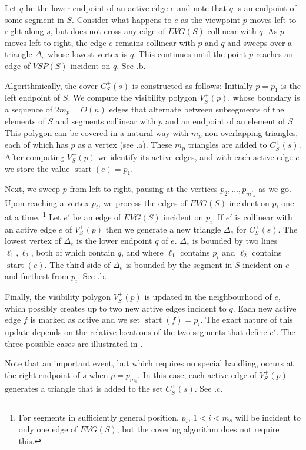 \documentclass{patmorin}
\newcommand{\EVG}{\mathit{EVG}}
\newcommand{\VSP}{\mathit{VSP}}
\DeclareMathOperator{\start}{start}
\begin{document}
Let $q$ be the lower endpoint of an active edge $e$ and note that $q$
is an endpoint of some segment in $S$. Consider what happens to $e$
as the viewpoint $p$ moves left to right along $s$, but does not cross
any edge of $\EVG(S)$ collinear with $q$.  As $p$ moves left to right,
the edge $e$ remains collinear with $p$ and $q$ and sweeps over a
triangle $\Delta_e$ whose lowest vertex is $q$.  This continues until
 the point $p$ reaches an edge of $\VSP(S)$ incident on $q$.
See .b.

Algorithmically, the cover $C^+_S(s)$ is constructed as follows: Initially
$p=p_1$ is the left endpoint of $S$.  We compute the visibility polygon
$V^+_S(p)$, whose boundary is a sequence of $2m_p=O(n)$ edges that alternate
between subsegments of the elements of $S$ and segments collinear with $p$
and an endpoint of an element of $S$.  This polygon can be covered in a
natural way with $m_p$ non-overlapping triangles, each of which has $p$
as a vertex (see .a). These $m_p$ triangles are added to
$C^+_S(s)$.  After computing $V^+_S(p)$ we identify its active edges, and with
each active edge $e$ we store the value $\start(e)=p_1$.


Next, we sweep $p$ from left to right, pausing at the vertices
$p_2,\ldots,p_{m'_s}$ as we go.  Upon reaching a vertex $p_i$, we process
the edges of $\EVG(S)$ incident on $p_i$ one at a time.  \footnote{For
segments in sufficiently general position, $p_i$, $1<i<m_s$ will be
incident to only one edge of $\EVG(S)$, but the covering algorithm does
not require this.} Let $e'$ be an edge of $\EVG(S)$ incident on $p_i$. If
$e'$ is collinear with an active edge $e$ of $V^+_S(p)$ then we generate a
new triangle $\Delta_e$ for $C^+_S(s)$.  The lowest vertex of $\Delta_e$
is the lower endpoint $q$ of $e$. $\Delta_e$ is bounded by two lines
$\ell_1, \ell_2$, both of which contain $q$, and where $\ell_1$ contains
$p_i$ and $\ell_2$ contains $\start(e)$.  The third side of $\Delta_e$
is bounded by the segment in $S$ incident on $e$ and furthest from $p_i$.
See .b.

Finally, the visibility polygon $V^+_S(p)$ is updated in the neighbourhood
of $e$, which possibly creates up to two new active edges incident to $q$.
Each new active edge $f$ is marked as active and we set $\start(f)=p_i$.
The exact nature of this update depends on the relative locations of the
two segments that define $e'$.  The three possible cases are illustrated
in .

Note that an important event, but which requires no special handling, occurs
at the right endpoint of $s$ when $p=p_{m_s}$.  In this case, each active
edge of $V^+_S(p)$ generates a triangle that is added to the set $C^+_S(s)$.
See .c.
\end{document}
